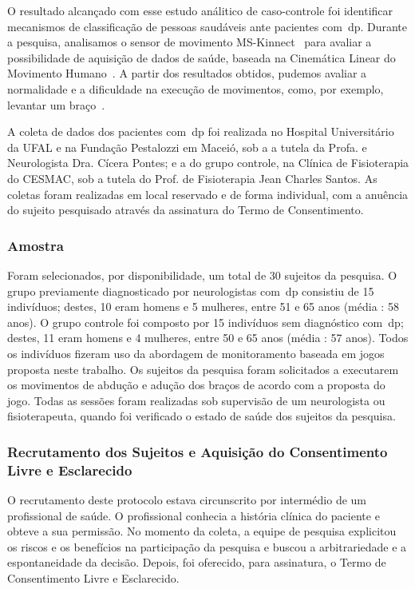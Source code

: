 O resultado alcançado com esse estudo análitico de caso-controle foi identificar mecanismos de classificação de pessoas saudáveis ante pacientes com~\ac{dp}. Durante a pesquisa, analisamos o sensor de movimento MS-Kinnect~\cite{kinnect2013} para avaliar a possibilidade de aquisição de dados de saúde, baseada na Cinemática Linear do Movimento Humano~\cite{mcginnis2013biomechanics}. A partir dos resultados obtidos, pudemos avaliar a normalidade e a dificuldade na execução de movimentos, como, por exemplo, levantar um braço~\cite{mcginnis2013biomechanics}.

A coleta de dados dos pacientes com~\ac{dp} foi realizada no Hospital Universitário da UFAL e na Fundação Pestalozzi em Maceió, sob a a tutela da Profa. e Neurologista Dra. Cícera Pontes; e a do grupo controle, na Clínica de Fisioterapia do CESMAC, sob a tutela do Prof. de Fisioterapia Jean Charles Santos. As coletas foram realizadas em local reservado e de forma individual, com a anuência do sujeito pesquisado através da assinatura do Termo de Consentimento.

\subsubsection{Amostra}
Foram selecionados, por disponibilidade, um total de 30 sujeitos da pesquisa. O grupo previamente diagnosticado por neurologistas com~\ac{dp} consistiu de 15 indivíduos; destes, 10 eram homens e 5 mulheres, entre 51 e 65 anos (média : 58 anos). O grupo controle foi composto por 15 indivíduos sem diagnóstico com~\ac{dp}; destes, 11 eram homens e 4 mulheres, entre 50 e 65 anos (média : 57 anos). Todos os indivíduos fizeram uso da abordagem de monitoramento baseada em jogos proposta neste trabalho. Os sujeitos da pesquisa foram solicitados a executarem os movimentos de abdução e adução dos braços de acordo com a proposta do jogo. Todas as sessões foram realizadas sob supervisão de um neurologista ou fisioterapeuta, quando foi verificado o estado de saúde dos sujeitos da pesquisa. 


\subsubsection{Recrutamento dos Sujeitos e Aquisição do Consentimento Livre e Esclarecido}
O recrutamento deste protocolo estava circunscrito por intermédio de um profissional de saúde. O profissional conhecia a história clínica do paciente e obteve a sua permissão. No momento da coleta, a equipe de pesquisa explicitou os riscos e os benefícios na participação da pesquisa e buscou a arbitrariedade e a espontaneidade da decisão. Depois, foi oferecido, para assinatura, o Termo de Consentimento Livre e Esclarecido.

